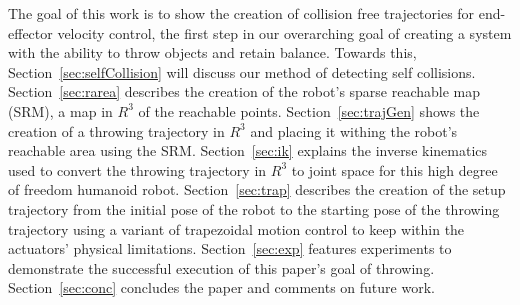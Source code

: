 
The goal of this work is to show the creation of collision free trajectories for end-effector velocity control, the first step in our overarching goal of creating a system with the ability to throw objects and retain balance.  Towards this, Section~\ref{sec:selfCollision} will discuss our method of detecting self collisions.  Section~\ref{sec:rarea} describes the creation of the robot's sparse reachable map (SRM), a map in $R^3$ of the reachable points.  Section~\ref{sec:trajGen} shows the creation of a throwing trajectory in $R^3$ and placing it withing the robot's reachable area using the SRM.  Section~\ref{sec:ik} explains the inverse kinematics used to convert the throwing trajectory in $R^3$ to joint space for this high degree of freedom humanoid robot.  Section~\ref{sec:trap} describes the creation of the setup trajectory from the initial pose of the robot to the starting pose of the throwing trajectory using a variant of trapezoidal motion control to keep within the actuators' physical limitations.  Section~\ref{sec:exp} features experiments to demonstrate the successful execution of this paper's goal of throwing.  Section~\ref{sec:conc} concludes the paper and comments on future work.


